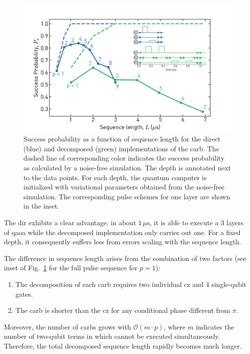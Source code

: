\begin{figure}[ht]
    \centering
    \includegraphics[width=\textwidth]{chapters/qaoa/figs/ch5_qaoa_sequence_lengths_v1_withinset_20200202_120000.png}
    \caption{Success probability as a function of sequence length for the direct (blue) and decomposed (green) implementations of the \gls{carb}. The dashed line of corresponding color indicates the success probability as calculated by a noise-free simulation. The depth is annotated next to the data points. For each depth, the quantum computer is initialized with variational parameters obtained from the noise-free simulation. The corresponding pulse schemes for one layer are shown in the inset.}
    \label{fig:qaoa_sequence_lengths}
\end{figure}

The \gls{dir} exhibits a clear advantage: in about $1\,\mu\text{s}$, it is able to execute a 3 layers of \gls{qaoa} while the decomposed implementation only carries out one. For a fixed depth, it consequently suffers less from errors scaling with the sequence length. 

The difference in sequence length arises from the combination of two factors (see inset of Fig.~\ref{fig:qaoa_sequence_lengths} for the full pulse sequence for $p=1$):
\begin{enumerate}
    \item The decomposition of each \gls{carb} requires two individual \gls{cz} and 4 single-qubit gates. 
    \item The \gls{carb} is shorter than the \gls{cz} for any conditional phase different from $\pi$.
\end{enumerate}
Moreover, the number of \glspl{carb} grows with $\mathcal{O}(m\cdot p)$, where $m$ indicates the number of two-qubit terms in \costh{} which cannot be executed simultaneously. Therefore, the total decomposed sequence length rapidly becomes much longer. 

